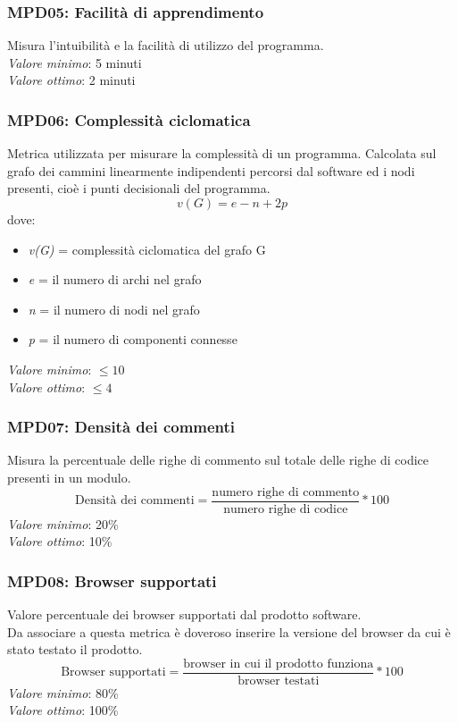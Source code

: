 \subsubsection{MPD05: Facilità di apprendimento}
Misura l'intuibilità e la facilità di utilizzo del programma.\\
\textit{Valore minimo}: 5 minuti\\
\textit{Valore ottimo}: 2 minuti\\

\subsubsection{MPD06: Complessità ciclomatica}
Metrica utilizzata per misurare la complessità di un programma. Calcolata sul grafo dei cammini linearmente indipendenti percorsi dal software ed i nodi presenti, cioè i punti decisionali del programma.\\
\begin{equation*}
v(G) = e - n + 2p
\end{equation*}
dove:
\begin{itemize}
	\item \textit{v(G)} = complessità ciclomatica del grafo G
	\item \textit{e} = il numero di archi nel grafo
	\item \textit{n} = il numero di nodi nel grafo
	\item \textit{p} = il numero di componenti connesse
\end{itemize}
\textit{Valore minimo}: $ \le 10 $\\
\textit{Valore ottimo}: $ \le 4 $\\

\subsubsection{MPD07: Densità dei commenti}
Misura la percentuale delle righe di commento sul totale delle righe di codice presenti in un modulo.\\
\begin{equation*}
\text{Densità dei commenti}=\frac{\text{numero righe di commento}}{\text{numero righe di codice}}*100
\end{equation*}
\textit{Valore minimo}: 20\%\\
\textit{Valore ottimo}: 10\%\\

\subsubsection{MPD08: Browser supportati}
Valore percentuale dei browser supportati dal prodotto software.\\
Da associare a questa metrica è doveroso inserire la versione del browser da cui è stato testato il prodotto.
\begin{equation*}
\text{Browser supportati}=\frac{\text{browser in cui il prodotto funziona}}{\text{browser testati}}*100
\end{equation*}	
\textit{Valore minimo}: 80\%\\
\textit{Valore ottimo}: 100\%\\
